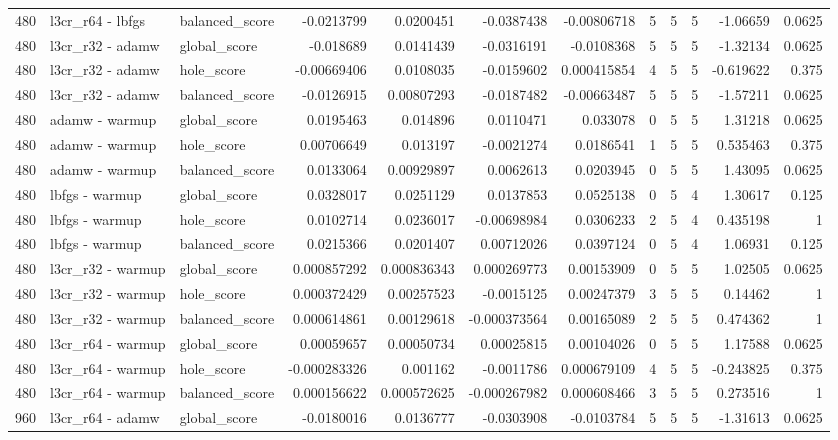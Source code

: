 \begin{tabular}{rllrrrrrrrrr}
480 & l3cr_r64 - lbfgs & balanced_score & -0.0213799 & 0.0200451 & -0.0387438 & -0.00806718 & 5 & 5 & 5 & -1.06659 & 0.0625 \\
480 & l3cr_r32 - adamw & global_score & -0.018689 & 0.0141439 & -0.0316191 & -0.0108368 & 5 & 5 & 5 & -1.32134 & 0.0625 \\
480 & l3cr_r32 - adamw & hole_score & -0.00669406 & 0.0108035 & -0.0159602 & 0.000415854 & 4 & 5 & 5 & -0.619622 & 0.375 \\
480 & l3cr_r32 - adamw & balanced_score & -0.0126915 & 0.00807293 & -0.0187482 & -0.00663487 & 5 & 5 & 5 & -1.57211 & 0.0625 \\
480 & adamw - warmup & global_score & 0.0195463 & 0.014896 & 0.0110471 & 0.033078 & 0 & 5 & 5 & 1.31218 & 0.0625 \\
480 & adamw - warmup & hole_score & 0.00706649 & 0.013197 & -0.0021274 & 0.0186541 & 1 & 5 & 5 & 0.535463 & 0.375 \\
480 & adamw - warmup & balanced_score & 0.0133064 & 0.00929897 & 0.0062613 & 0.0203945 & 0 & 5 & 5 & 1.43095 & 0.0625 \\
480 & lbfgs - warmup & global_score & 0.0328017 & 0.0251129 & 0.0137853 & 0.0525138 & 0 & 5 & 4 & 1.30617 & 0.125 \\
480 & lbfgs - warmup & hole_score & 0.0102714 & 0.0236017 & -0.00698984 & 0.0306233 & 2 & 5 & 4 & 0.435198 & 1 \\
480 & lbfgs - warmup & balanced_score & 0.0215366 & 0.0201407 & 0.00712026 & 0.0397124 & 0 & 5 & 4 & 1.06931 & 0.125 \\
480 & l3cr_r32 - warmup & global_score & 0.000857292 & 0.000836343 & 0.000269773 & 0.00153909 & 0 & 5 & 5 & 1.02505 & 0.0625 \\
480 & l3cr_r32 - warmup & hole_score & 0.000372429 & 0.00257523 & -0.0015125 & 0.00247379 & 3 & 5 & 5 & 0.14462 & 1 \\
480 & l3cr_r32 - warmup & balanced_score & 0.000614861 & 0.00129618 & -0.000373564 & 0.00165089 & 2 & 5 & 5 & 0.474362 & 1 \\
480 & l3cr_r64 - warmup & global_score & 0.00059657 & 0.00050734 & 0.00025815 & 0.00104026 & 0 & 5 & 5 & 1.17588 & 0.0625 \\
480 & l3cr_r64 - warmup & hole_score & -0.000283326 & 0.001162 & -0.0011786 & 0.000679109 & 4 & 5 & 5 & -0.243825 & 0.375 \\
480 & l3cr_r64 - warmup & balanced_score & 0.000156622 & 0.000572625 & -0.000267982 & 0.000608466 & 3 & 5 & 5 & 0.273516 & 1 \\
960 & l3cr_r64 - adamw & global_score & -0.0180016 & 0.0136777 & -0.0303908 & -0.0103784 & 5 & 5 & 5 & -1.31613 & 0.0625 \\

\end{tabular}
